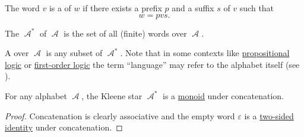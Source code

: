 \begin{definition}
\begin{thmenum}
     The word \( v \) is a  of \( w \) if there exists a prefix \( p \) and a suffix \( s \) of \( v \) such that
    \begin{equation*}
      w = pvs.
    \end{equation*}

     The  \( \mscrA^{\ast} \) of \( \mscrA \) is the set of all (finite) words over \( \mscrA \).

     A  over \( \mscrA \) is any subset of \( \mscrA^{\ast} \). Note that in some contexts like \hyperref[subsec:propositional_logic]{propositional logic} or \hyperref[subsec:first_order_logic]{first-order logic} the term \enquote{language} may refer to the alphabet itself (see ).
  \end{thmenum}
\end{definition}

\begin{proposition}\label{thm:kleene_star_is_monoid}
  For any alphabet \( \mscrA \), the Kleene star \( \mscrA^{\ast} \) is a \hyperref[def:unital_magma/associative]{monoid} under concatenation.
\end{proposition}
\begin{proof}
  Concatenation is clearly associative and the empty word \( \varepsilon \) is a \hyperref[def:magma_identity]{two-sided identity} under concatenation.
\end{proof}
